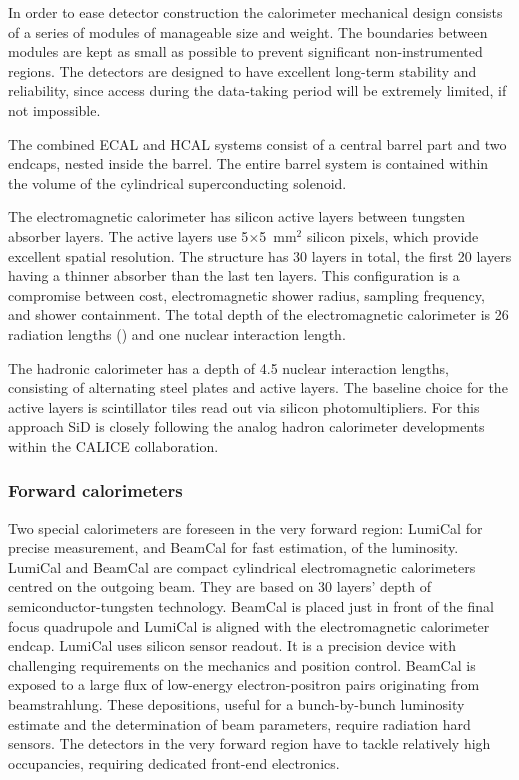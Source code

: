In order to ease detector construction the calorimeter mechanical design consists of a series of modules of
manageable size and weight. The boundaries between
modules are kept as small as possible to prevent significant non-instrumented
regions. The detectors are designed to have excellent long-term stability and reliability,
since access during the data-taking period will be extremely limited, if not
impossible.

The combined ECAL and HCAL systems consist of a
central barrel part and two endcaps, nested inside the barrel. The entire barrel system is contained
within the volume of the cylindrical superconducting solenoid. 

The
electromagnetic calorimeter has silicon active layers between tungsten absorber
layers. The active layers use 5$\times$5~mm$^2$ silicon pixels, which provide excellent spatial resolution.
The structure has 30 layers in total, the first 20 layers having a
thinner absorber than the last ten layers. This configuration is a 
compromise between cost, electromagnetic shower radius, sampling frequency, and
shower containment. The total depth of the electromagnetic calorimeter is 26
radiation lengths (\xo) and one nuclear interaction length. 

The hadronic
calorimeter has a depth of 4.5 nuclear interaction lengths, consisting of
alternating steel plates and active layers. The baseline choice for the active
layers is scintillator tiles read out via silicon photomultipliers. For this approach SiD is closely following the analog hadron calorimeter developments within the CALICE collaboration.

\subsubsection{Forward calorimeters}

Two special calorimeters are foreseen in the very forward region: LumiCal for precise measurement, and BeamCal for fast
estimation, of the luminosity. LumiCal and BeamCal are
compact cylindrical electromagnetic calorimeters centred on the outgoing beam.
They are based on 30 layers' depth of semiconductor-tungsten technology. BeamCal
is placed just in front of the final focus quadrupole and LumiCal is aligned
with the electromagnetic calorimeter endcap. LumiCal uses silicon sensor readout.
It is a precision device with
challenging requirements on the mechanics and position control. BeamCal is
exposed to a large flux of low-energy electron-positron pairs originating from
beamstrahlung. These depositions, useful for a bunch-by-bunch luminosity
estimate and the determination of beam parameters, require radiation hard
sensors. The detectors in the very forward region have to tackle relatively high
occupancies, requiring dedicated front-end electronics.

